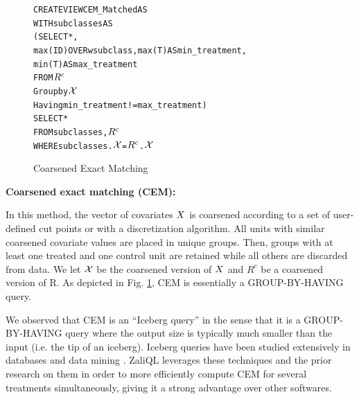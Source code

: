\begin{figure}
\begin{alltt} \scriptsize
CREATE VIEW CEM_Matched AS
WITH subclasses AS
  (SELECT *,
          max(ID) OVER w subclass, max(T) AS min_treatment,
          min(T)AS max_treatment
   FROM \(\crele\)
   Group by \(\ccv\)
   Having min_treatment!=max_treatment)
SELECT *
FROM subclasses,\(\crele\)
WHERE subclasses.\(\ccv\)=\(\crele\).\(\ccv\)

\end{alltt}
\vspace{-.45cm}
  \caption{Coarsened Exact Matching}\label{fig:cem}
\end{figure}



{\bf Coarsened exact matching (CEM):}
In this method, the vector of covariates ${{X}}$ is coarsened according to a set of user-defined cut points or with a discretization algorithm. All units with similar coarsened covariate values are placed in unique groups. Then, groups with at least one treated and one control unit are retained while all others are discarded from data. We let ${{\mathcal{X}}}$ be the coarsened version of ${{X}}$ and $R^c$ be a coarsened version of R. As depicted in Fig. \ref{fig:cem}, CEM is essentially a GROUP-BY-HAVING query. 

We observed that CEM is an ``Iceberg query'' in the sense that it is a GROUP-BY-HAVING query where the output size is typically much smaller than the input (i.e. the tip of an iceberg). Iceberg queries have been studied extensively in databases and data mining \cite{fang1999computing,findlater2003iceberg}. ZaliQL leverages these techniques and the prior research on them in order to more efficiently compute CEM for several treatments simultaneously, giving it a strong advantage over other softwares.


